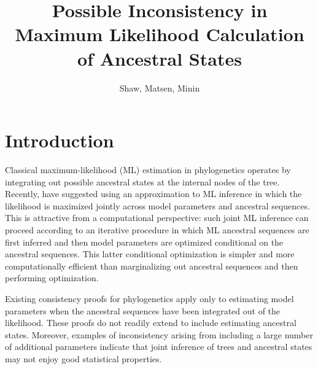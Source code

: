 \documentclass{article}
\title{Possible Inconsistency in Maximum Likelihood Calculation of Ancestral States}
\author{Shaw, Matsen, Minin}
\begin{document}
\maketitle


\renewcommand{\arraystretch}{1.2} %


\section*{Introduction}

Classical maximum-likelihood (ML) estimation in phylogenetics operates by integrating out possible ancestral states at the internal nodes of the tree.
Recently, \cite{Neher2017} have suggested using an approximation to ML inference in which the likelihood is maximized jointly across model parameters and ancestral sequences.
This is attractive from a computational perspective: such joint ML inference can proceed according to an iterative procedure in which ML ancestral sequences are first inferred and then model parameters are optimized conditional on the ancestral sequences.
This latter conditional optimization is simpler and more computationally efficient than marginalizing out ancestral sequences and then performing optimization.

Existing consistency proofs for phylogenetics \cite{RoyChoudhury2015-ta} apply only to estimating model parameters when the ancestral sequences have been integrated out of the likelihood.
These proofs do not readily extend to include estimating ancestral states.
Moreover, examples of inconsistency arising from including a large number of additional parameters \cite{Neyman1948-tt} indicate that joint inference of trees and ancestral states may not enjoy good statistical properties.
\end{document}

